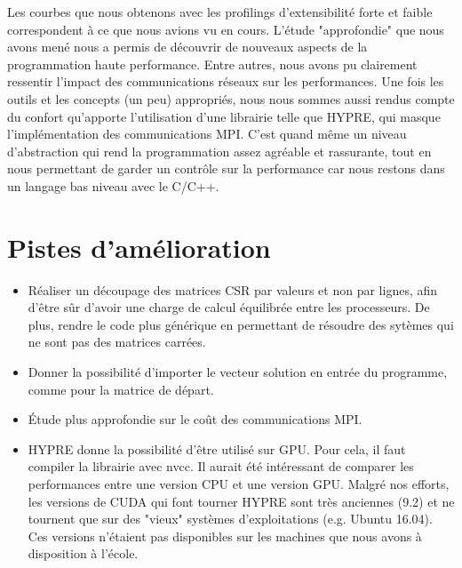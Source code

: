 \documentclass[10pt,twocolumn,letterpaper]{article}
\begin{document}
Les courbes que nous obtenons avec les profilings d'extensibilité forte et
faible correspondent à ce que nous avions vu en cours.
L'étude "approfondie"
que nous avons mené nous a permis de découvrir de nouveaux aspects de la
programmation haute performance. Entre autres, nous avons pu clairement
ressentir l'impact des communications réseaux sur les performances.
Une fois les outils et les concepts (un peu) appropriés, nous nous sommes aussi
rendus compte du confort qu'apporte l'utilisation
d'une librairie telle que HYPRE,
qui masque l'implémentation des communications MPI. C'est quand même un niveau
d'abstraction qui rend la programmation assez agréable et rassurante, tout en
nous permettant de garder un contrôle sur la performance
car nous restons dans un langage bas niveau avec le C/C++.

\section*{Pistes d'amélioration}

\begin{itemize}
  \item Réaliser un découpage des matrices CSR par valeurs et non
par lignes, afin d'être sûr d'avoir une charge de calcul équilibrée entre les
processeurs. De plus, rendre le code plus générique en permettant de résoudre
des sytèmes qui ne sont pas des matrices carrées.
  \item Donner la possibilité d'importer le vecteur solution en
entrée du programme, comme pour la matrice de départ.
  \item Étude plus approfondie sur le coût des communications MPI.
  \item HYPRE donne la possibilité d'être utilisé sur GPU. Pour
cela, il faut compiler la librairie avec nvcc. Il aurait été intéressant de
comparer les performances entre une version CPU et une version GPU. Malgré nos
efforts, les versions de CUDA qui font tourner HYPRE sont très anciennes (9.2)
et ne tournent que sur des "vieux" systèmes d'exploitations (e.g. Ubuntu 16.04).
Ces versions n'étaient pas disponibles sur les machines que nous avons à
disposition à l'école.
\end{itemize}


\end{document}
